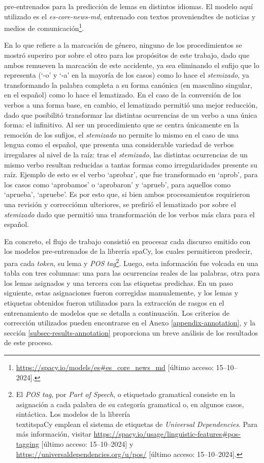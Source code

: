 pre-entrenados para la predicci\'on de lemas en distintos idiomas. El modelo aqu\'i
utilizado es el \textit{es-core-news-md}, entrenado con textos
proveniendtes de noticias y medios de
comunicaci\'on\footnote{\url{https://spacy.io/models/es\#es_core_news_md}
[\'ultimo acceso: 15--10--2024].}.
\par
En lo que refiere a la marcaci\'on de g\'enero, ninguno de los procedimientos se mostr\'o
superiro por sobre el otro para los prop\'ositos de este trabajo, dado que ambos
remueven la marcaci\'on de este accidente, ya sea eliminando el sufijo que lo
representa (`-o' y `-a' en la mayor\'ia de los casos) como lo hace el
\textit{stemizado}, ya transformando la palabra completa a su forma can\'onica
(en masculino singular, en el español) como lo hace el lematizado. En el caso
de la conversi\'on de los verbos a una forma base, en cambio, el lematizado permiti\'o
una mejor reducci\'on, dado que posibilit\'o transformar las distintas ocurrencias
de un verbo a una \'unica forma: el infinitivo. Al ser un procedimiento que se
centra \'unicamente en la remoci\'on de los sufijos, el \textit{stemizado} no permite
lo mismo en el caso de una lengua como el español, que presenta una considerable
variedad de verbos irregulares al nivel de la ra\'iz: tras el
\textit{stemizado}, las distintas ocurrencias de un mismo verbo resultan reducidas
a tantas formas como irregularidades presente su ra\'iz. Ejemplo de esto es el
verbo `aprobar', que fue transformado en `aprob', para los casos como
`aprobamos' o `aprobaron' y `aprueb', para aquellos como `aprueba',
`apruebe'. Es por esto que, si bien ambos procesamientos requirieron una revisi\'on
y correcci\'omn ulteriores, se prefiri\'o el lematizado por sobre el \textit{stemizado}
dado que permiti\'o una transformaci\'on de los verbos m\'as clara para el español.
\par
En concreto, el flujo de trabajo consisti\'o en procesar cada discurso emitido
con los modelos pre-entrenados de la librer\'ia spaCy, los cuales permitieron
predecir, para cada \textit{token}, su lema y \textit{POS tag}\footnote{El
\textit{POS tag}, por \textit{Part of Speech}, o etiquetado gramatical consiste
en la asignaci\'on a cada palabra de su categor\'ia gramatical o, en algunos casos,
sint\'actica. Los modelos de la
librer\'ia \\textit{spaCy} emplean el sistema de etiquetas de \textit{Universal Dependencies}.
Para m\'as informaci\'on, visitar
\url{https://spacy.io/usage/linguistic-features\#pos-tagging}
[\'ultimo acceso: 15--10--2024]
y \url{https://universaldependencies.org/u/pos/}
[\'ultimo acceso: 15--10--2024].}. Luego, esta
informaci\'on fue volcada en una tabla con tres columnas: una para las ocurrencias
reales de las palabras, otra para los lemas asignados y una tercera con las etiquetas predichas. En un paso siguiente, estas asignaciones fueron corregidas
manualemente, y los lemas y etiquetas obtenidos fueron utilizados para la
extracci\'on de rasgos en el entrenamiento de modelos que se detalla a continuaci\'on.
Los criterios de correcci\'on utilizados pueden encontrarse en el Anexo
\ref{appendix-annotation}, y la secci\'on \ref{subsec-results-annotation}
proporciona un breve an\'alisis de los resultados de este proceso.
